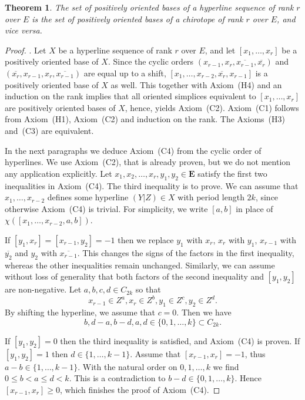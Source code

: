 \documentclass[a4paper]{amsart}
\newtheorem{theorem}{Theorem}
\theoremstyle{definition}
\theoremstyle{remark}
\begin{document}
\begin{theorem}\label{thm:HLS-Chi}
  The set of positively oriented bases of a hyperline sequence of rank $r$ over
  $E$ is the set of positively oriented bases of a chirotope of rank $r$ over
  $E$, and vice versa.
\end{theorem}
\begin{proof}
. Let $X$ be a hyperline sequence of rank $r$ over $E$, and let
  $[x_1,\dots, x_r]$ be a positively oriented base of $X$.
  Since the cyclic orders
  $(x_{r-1},x_r,\overline{x_{r-1}},\overline{x_r})$ and 
  $(\overline{x_r}, x_{r-1},x_r,\overline{x_{r-1}})$ are equal up to a
  shift, $[x_1,\dots,x_{r-2},\overline{x_r},x_{r-1}]$ is a positively
  oriented base of $X$ as well. This together with Axiom~(H4) and an
  induction on the rank implies that all oriented simplices equivalent to
  $[x_1,\dots, x_r]$ are positively oriented bases of $X$, hence, yields
  Axiom~(C2).
%
  Axiom~(C1) follows from Axiom~(H1), Axiom~(C2) and induction on the
  rank.
  The Axioms~(H3) and~(C3) are equivalent. 
  
  In the next paragraphs we deduce Axiom~(C4) from the cyclic order of
  hyperlines. We use Axiom~(C2), that is already proven, but we do not
  mention any application explicitly.
%
  Let $x_1,x_2,\dots, x_r, y_1,y_2\in \mathbf E$
  satisfy the first two inequalities in Axiom~(C4).
  The third inequality is to prove. We can assume that $x_1,\dots,x_{r-2}$
  defines some hyperline $(Y|Z)\in X$ with period length $2k$, 
  since otherwise Axiom~(C4) is trivial.
%
  For simplicity, we write $[a,b]$ in place of $\chi([x_1,\dots,x_{r-2},
  a,b])$.
  
  If $[y_1,x_r]=[x_{r-1},y_2]=-1$ then we replace $y_1$ with $x_r$,
  $x_r$ with $y_1$, $x_{r-1}$ with $\overline{y_2}$ and $y_2$ with
  $\overline{x_{r-1}}$. This changes the signs of the factors in the first
  inequality, whereas the other inequalities remain unchanged.
%
  Similarly, we can assume without loss of generality that both 
  factors of the second inequality and $[y_1,y_2]$ are non-negative.
%  
  Let $a,b,c,d \in C_{2k}$ so that $$x_{r-1}\in Z^a, x_{r}\in Z^b,
  y_1\in Z^c, y_2\in Z^d.$$
  By shifting the hyperline, we assume that
  $c=0$.  Then we have $$
  b, d-a, b-d, a, d \in \{0,1,\dots,k\}\subset
  C_{2k}.$$

  If $[y_1,y_2]=0$ then the third inequality is satisfied, and
  Axiom~(C4) is proven.  If $[y_1,y_2]=1$ then $d\in\{1,\dots,k-1\}$.
  Assume that $[x_{r-1},x_{r}]=-1$, thus $a-b\in \{1,\dots,k-1\}$.
  With the natural order on $0,1,\dots,k$ we find $0\le b < a\le d <
  k$. This is a contradiction to $b-d\in \{0,1,\dots,k\}$.  Hence
  $[x_{r-1},x_r]\ge 0$, which finishes the proof of Axiom~(C4).


\end{proof}
\end{document}
